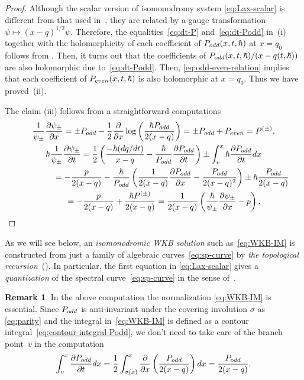 \documentclass[11pt]{article}
\theoremstyle{definition}
\newtheorem{rem}[thm]{Remark}
\numberwithin{equation}{section}
\def\p{\partial}
\begin{document}
\begin{proof}
Although the scalar version of isomonodromy system \eqref{eq:Lax-scalar}
is dif\/ferent from that used in~\cite{KT-PI}, they are
related by a gauge transformation $\psi \mapsto (x-q)^{1/2} \psi$.
Therefore, the equalities~\eqref{eq:dt-P} and~\eqref{eq:dt-Podd}
in~(i) together with the holomorphicity of each coef\/f\/icient
of $P_{\rm odd}(x,t,\hbar)$ at $x=q_{0}$ follows from
\cite[Proposition~1.2 and Theorem~1.1]{KT-PI}.
Then, it turns out that the coef\/f\/icients of
$P_{\rm odd}(x,t,\hbar)/(x-q(t,\hbar))$
are also holomorphic due to~\eqref{eq:dt-Podd}.
Then, \eqref{eq:odd-even-relation}
implies that each coef\/f\/icient of $P_{\rm even}(x,t,\hbar)$ is also
holomorphic at $x=q_{0}$.
Thus we have proved~(ii).

The claim (iii) follows from a straightforward computations
\begin{gather*}
\frac{1}{\psi_{\pm}} \frac{\p \psi_{\pm}}{\p x}  =
\pm P_{\rm odd} -\frac{1}{2}\frac{\p}{\p x} \log
\left(\frac{ \hbar P_{\rm odd}}{2(x-q)}\right)
= \pm P_{\rm odd} + P_{\rm even}
= P^{(\pm)}, \\
\hbar\frac{1}{\psi_{\pm}} \frac{\p \psi_{\pm}}{\p t}   =
\frac{1}{2}\left( \frac{-\hbar (dq/dt)}{x-q} - \frac{\hbar}{P_{\rm odd}}
\frac{\p P_{\rm odd}}{\p t} \right) \pm \int^{x}_{v}
\hbar\frac{\p P_{\rm odd}}{\p t} dx \\
\hphantom{\hbar\frac{1}{\psi_{\pm}} \frac{\p \psi_{\pm}}{\p t}  }{}
  =
-\frac{p}{2(x-q)} - \frac{\hbar}{P_{\rm odd}}
\left( \frac{1}{2(x-q)}\frac{\p P_{\rm odd}}{\p x} -
\frac{P_{\rm odd}}{2(x-q)^{2}} \right) \pm \hbar \frac{P_{\rm odd}}{2(x-q)} \\
\hphantom{\hbar\frac{1}{\psi_{\pm}} \frac{\p \psi_{\pm}}{\p t}  }{} =
-\frac{p}{2(x-q)} + \frac{\hbar P^{(\pm)}}{2(x-q)} =
\frac{1}{2(x-q)} \left( \frac{\hbar}{\psi_{\pm}}
\frac{\p \psi_{\pm}}{\p x} - p \right).\tag*{\qed}
\end{gather*}
\renewcommand{\qed}{}
\end{proof}

As we will see below, an {\em isomonodromic WKB solution}
such as~\eqref{eq:WKB-IM}
is constructed from just a family of algebraic curves~\eqref{eq:sp-curve}
by {\em the topological recursion}~(\cite{EO07}).
In particular, the f\/irst equation
in \eqref{eq:Lax-scalar} gives a {\em quantization}
of the spectral curve~\eqref{eq:sp-curve}
in the sense of~\cite{DM14, DM14-2}.

\begin{rem}
In the above computation the normalization \eqref{eq:WKB-IM}
is essential. Since $P_{\rm odd}$ is anti-invariant under the
covering involution $\sigma$ as \eqref{eq:parity} and
the integral in~\eqref{eq:WKB-IM} is
def\/ined as a contour integral~\eqref{eq:contour-integral-Podd},
we don't need to take care of the branch point~$v$ in the computation
\begin{gather*}
\int^{x}_{v} \frac{\partial P_{\rm odd}}{\partial t}dx =
\frac{1}{2}\int^{x}_{\sigma(x)}
\frac{\p}{\p x}\left( \frac{P_{\rm odd}}{2(x-q)}\right)dx
= \frac{P_{\rm odd}}{2(x-q)}.
\end{gather*}
\end{rem}
\end{document}
